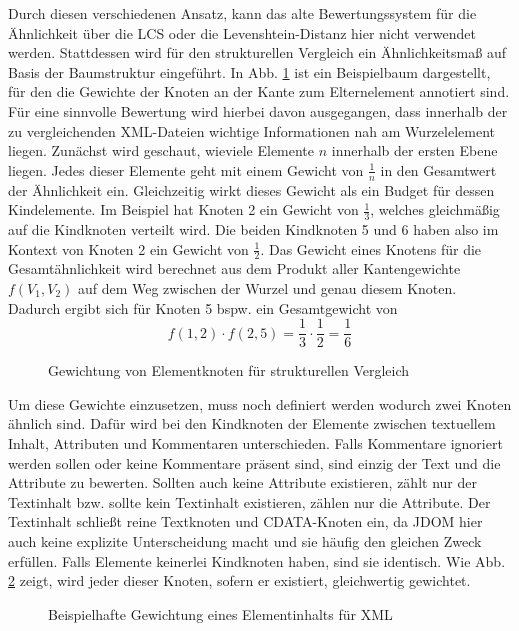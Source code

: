 Durch diesen verschiedenen Ansatz, kann das alte Bewertungssystem für die Ähnlichkeit über die LCS oder die Levenshtein-Distanz hier nicht verwendet werden. Stattdessen wird für den strukturellen Vergleich ein Ähnlichkeitsmaß auf Basis der Baumstruktur eingeführt. In Abb. \ref{fig:ähnlichkeitBaum} ist ein Beispielbaum dargestellt, für den die Gewichte der Knoten an der Kante zum Elternelement annotiert sind. Für eine sinnvolle Bewertung wird hierbei davon ausgegangen, dass innerhalb der zu vergleichenden XML-Dateien wichtige Informationen nah am Wurzelelement liegen. Zunächst wird geschaut, wieviele Elemente $n$ innerhalb der ersten Ebene liegen. Jedes dieser Elemente geht mit einem Gewicht von \( \frac{1}{n} \) in den Gesamtwert der Ähnlichkeit ein. Gleichzeitig wirkt dieses Gewicht als ein Budget für dessen Kindelemente. Im Beispiel hat Knoten 2 ein Gewicht von \( \frac{1}{3} \), welches gleichmäßig auf die Kindknoten verteilt wird. Die beiden Kindknoten 5 und 6 haben also im Kontext von Knoten 2 ein Gewicht von \( \frac{1}{2} \). Das Gewicht eines Knotens für die Gesamtähnlichkeit wird berechnet aus dem Produkt aller Kantengewichte $f(V_1,V_2)$ auf dem Weg zwischen der Wurzel und genau diesem Knoten. Dadurch ergibt sich für Knoten 5 bspw. ein Gesamtgewicht von
\[ f(1,2) \cdot f(2,5) = \frac{1}{3} \cdot \frac{1}{2} = \frac{1}{6}\]
\begin{figure}
    \centering
    
    \caption{Gewichtung von Elementknoten für strukturellen Vergleich}
    \label{fig:ähnlichkeitBaum}
\end{figure}

Um diese Gewichte einzusetzen, muss noch definiert werden wodurch zwei Knoten ähnlich sind. Dafür wird bei den Kindknoten der Elemente zwischen textuellem Inhalt, Attributen und Kommentaren unterschieden. Falls Kommentare ignoriert werden sollen oder keine Kommentare präsent sind, sind einzig der Text und die Attribute zu bewerten. Sollten auch keine Attribute existieren, zählt nur der Textinhalt bzw. sollte kein Textinhalt existieren, zählen nur die Attribute. Der Textinhalt schließt reine Textknoten und CDATA-Knoten ein, da JDOM hier auch keine explizite Unterscheidung macht und sie häufig den gleichen Zweck erfüllen. Falls Elemente keinerlei Kindknoten haben, sind sie identisch. Wie Abb. \ref{fig:elementähnlichkeit} zeigt, wird jeder dieser Knoten, sofern er existiert, gleichwertig gewichtet.

\begin{figure}
    \centering
    
    \caption{Beispielhafte Gewichtung eines Elementinhalts für XML}
    \label{fig:elementähnlichkeit}
\end{figure}


